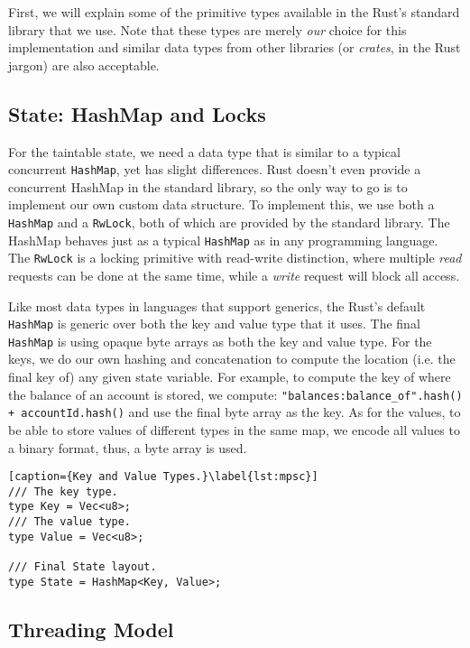 First, we will explain some of the primitive types available in the Rust's standard library that we
use. Note that these types are merely \textit{our} choice for this implementation and similar data
types from other libraries (or \textit{crates}, in the Rust jargon) are also acceptable.

\subsection{State: HashMap and Locks} \label{chap:impl:subsec:state_and_concurrent_map}

For the taintable state, we need a data type that is similar to a typical concurrent
\texttt{HashMap}\cite{barnatFastDynamicallySizedConcurrent2015}, yet has slight differences. Rust
doesn't even provide a concurrent HashMap in the standard library, so the only way to go is to
implement our own custom data structure. To implement this, we use both a \texttt{HashMap} and a
\texttt{RwLock}, both of which are provided by the standard library. The HashMap behaves just as a
typical \texttt{HashMap} as in any programming language. The \texttt{RwLock} is a locking primitive
with read-write distinction, where multiple \textit{read} requests can be done at the same time,
while a \textit{write} request will block all access.

Like most data types in languages that support generics, the Rust's default \texttt{HashMap} is
generic over both the key and value type that it uses. The final \texttt{HashMap} is using opaque
byte arrays as both the key and value type. For the keys, we do our own hashing and concatenation to
compute the location (i.e. the final key of) any given state variable. For example, to compute the
key of where the balance of an account is stored, we compute: \texttt{"balances:balance\_of".hash()
+ accountId.hash()} and use the final byte array as the key. As for the values, to be able to store
values of different types in the same map, we encode all values to a binary format, thus, a byte
array is used.

\begin{lstlisting}[caption={Key and Value Types.}\label{lst:mpsc}]
/// The key type.
type Key = Vec<u8>;
/// The value type.
type Value = Vec<u8>;

/// Final State layout.
type State = HashMap<Key, Value>;
\end{lstlisting}

\subsection{Threading Model}

